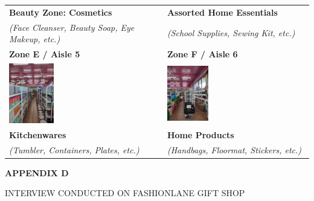 \begin{center}
\begin{longtable}{|>{\centering\arraybackslash}m{}|>{\centering\arraybackslash}m{}|}
		\textbf{Beauty Zone: Cosmetics} & \textbf{Assorted Home Essentials} \\
		\textit{(Face Cleanser, Beauty Soap, Eye Makeup, etc.)} & \textit{(School Supplies, Sewing Kit, etc.)} \\
		\hline
		\textbf{Zone E / Aisle 5} & \textbf{Zone F / Aisle 6} \\
		\includegraphics[width=0.30\textwidth]{appendices/zone5} & \includegraphics[width=0.30\textwidth]{appendices/zone6} \\
		\textbf{Kitchenwares} & \textbf{Home Products} \\
		\textit{(Tumbler, Containers, Plates, etc.)} & \textit{(Handbags, Floormat, Stickers, etc.)} \\
		\hline
	\end{longtable}
\end{center}

\clearpage

\begin{center}
	{\bf APPENDIX D}\\[24pt]
\end{center}

\begin{center}
	INTERVIEW CONDUCTED ON FASHIONLANE GIFT SHOP
\end{center}

